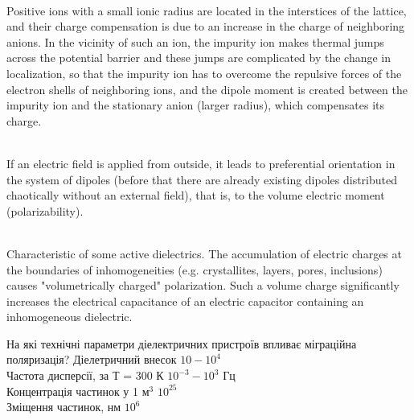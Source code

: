 \documentclass[a4paper,14pt]{extreport}
\begin{document}
 \\
Positive ions with a small ionic radius are located in the interstices of the lattice, and their charge compensation is due to an increase in the charge of neighboring anions. In the vicinity of such an ion, the impurity ion makes thermal jumps across the potential barrier and these jumps are complicated by the change in localization, so that the impurity ion has to overcome the repulsive forces of the electron shells of neighboring ions, and the dipole moment is created between the impurity ion and the stationary anion (larger radius), which compensates its charge.


 \\
If an electric field is applied from outside, it leads to preferential orientation in the system of dipoles (before that there are already existing dipoles distributed chaotically without an external field), that is, to the volume electric moment (polarizability).


 \\
Characteristic of some active dielectrics. The accumulation of electric charges at the boundaries of inhomogeneities (e.g. crystallites, layers, pores, inclusions) causes "volumetrically charged" polarization. Such a volume charge significantly increases the electrical capacitance of an electric capacitor containing an inhomogeneous dielectric.









\begin{tcolorbox}[colback=babyblue!10,colframe=babyblue!50!black,title=****]
На які технічні параметри діелектричних пристроїв впливає міграційна поляризація?
\tcblower
Діелетрич­ний внесок \hfill $10-10^4$\\
Частота дисперсії, за Т = 300 К \hfill $10^{-3}-10^3$ Гц\\
Концентрація частинок  у 1 м$^3$ \hfill $10^{25}$\\
Зміщення частинок, нм \hfill $10^6$\\
\end{tcolorbox}
\end{document}
